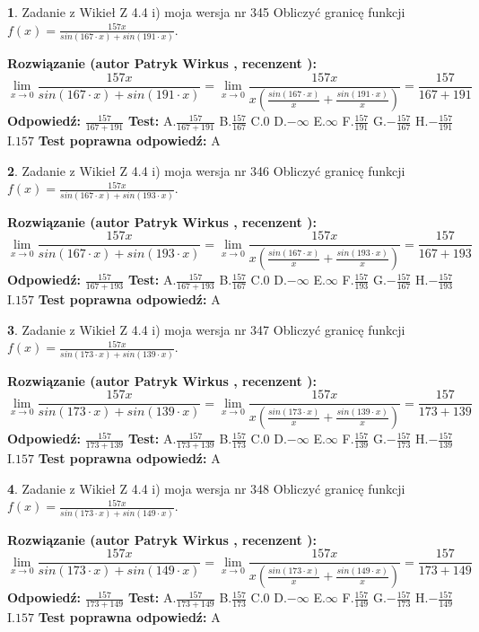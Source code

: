 \documentclass[12pt, a4paper]{article}
\theoremstyle{definition} %
\newtheorem{zad}{}
\newcommand{\zadStart}[1]{\begin{zad}#1\newline}
\newcommand{\zadStop}{\end{zad}}
\newcommand{\rozwStart}[2]{\noindent \textbf{Rozwiązanie (autor #1 , recenzent #2): }\newline}
\newcommand{\rozwStop}{\newline}
\newcommand{\odpStart}{\noindent \textbf{Odpowiedź:}\newline}
\newcommand{\odpStop}{\newline}
\newcommand{\testStart}{\noindent \textbf{Test:}\newline}
\newcommand{\testStop}{\newline}
\newcommand{\kluczStart}{\noindent \textbf{Test poprawna odpowiedź:}\newline}
\newcommand{\kluczStop}{\newline}
\begin{document}
\zadStart{Zadanie z Wikieł Z 4.4 i) moja wersja nr 345}
Obliczyć granicę funkcji $f(x)=\frac{157x}{sin(167\cdot x) +sin(191\cdot x)}$.
\zadStop
\rozwStart{Patryk Wirkus}{}
$$\lim\limits_{x\to 0}\frac{157x}{sin(167\cdot x) +sin(191\cdot x)}=\lim\limits_{x\to 0}\frac{157x}{x(\frac{sin(167\cdot x)}{x}+\frac{sin(191\cdot x)}{x})}=\frac{157}{167+191}$$
\rozwStop
\odpStart
$\frac{157}{167+191}$
\odpStop
\testStart
A.$\frac{157}{167+191}$
B.$\frac{157}{167}$
C.$0$
D.$-\infty$
E.$\infty$
F.$\frac{157}{191}$
G.$-\frac{157}{167}$
H.$-\frac{157}{191}$
I.$157$
\testStop
\kluczStart
A
\kluczStop



\zadStart{Zadanie z Wikieł Z 4.4 i) moja wersja nr 346}
Obliczyć granicę funkcji $f(x)=\frac{157x}{sin(167\cdot x) +sin(193\cdot x)}$.
\zadStop
\rozwStart{Patryk Wirkus}{}
$$\lim\limits_{x\to 0}\frac{157x}{sin(167\cdot x) +sin(193\cdot x)}=\lim\limits_{x\to 0}\frac{157x}{x(\frac{sin(167\cdot x)}{x}+\frac{sin(193\cdot x)}{x})}=\frac{157}{167+193}$$
\rozwStop
\odpStart
$\frac{157}{167+193}$
\odpStop
\testStart
A.$\frac{157}{167+193}$
B.$\frac{157}{167}$
C.$0$
D.$-\infty$
E.$\infty$
F.$\frac{157}{193}$
G.$-\frac{157}{167}$
H.$-\frac{157}{193}$
I.$157$
\testStop
\kluczStart
A
\kluczStop



\zadStart{Zadanie z Wikieł Z 4.4 i) moja wersja nr 347}
Obliczyć granicę funkcji $f(x)=\frac{157x}{sin(173\cdot x) +sin(139\cdot x)}$.
\zadStop
\rozwStart{Patryk Wirkus}{}
$$\lim\limits_{x\to 0}\frac{157x}{sin(173\cdot x) +sin(139\cdot x)}=\lim\limits_{x\to 0}\frac{157x}{x(\frac{sin(173\cdot x)}{x}+\frac{sin(139\cdot x)}{x})}=\frac{157}{173+139}$$
\rozwStop
\odpStart
$\frac{157}{173+139}$
\odpStop
\testStart
A.$\frac{157}{173+139}$
B.$\frac{157}{173}$
C.$0$
D.$-\infty$
E.$\infty$
F.$\frac{157}{139}$
G.$-\frac{157}{173}$
H.$-\frac{157}{139}$
I.$157$
\testStop
\kluczStart
A
\kluczStop



\zadStart{Zadanie z Wikieł Z 4.4 i) moja wersja nr 348}
Obliczyć granicę funkcji $f(x)=\frac{157x}{sin(173\cdot x) +sin(149\cdot x)}$.
\zadStop
\rozwStart{Patryk Wirkus}{}
$$\lim\limits_{x\to 0}\frac{157x}{sin(173\cdot x) +sin(149\cdot x)}=\lim\limits_{x\to 0}\frac{157x}{x(\frac{sin(173\cdot x)}{x}+\frac{sin(149\cdot x)}{x})}=\frac{157}{173+149}$$
\rozwStop
\odpStart
$\frac{157}{173+149}$
\odpStop
\testStart
A.$\frac{157}{173+149}$
B.$\frac{157}{173}$
C.$0$
D.$-\infty$
E.$\infty$
F.$\frac{157}{149}$
G.$-\frac{157}{173}$
H.$-\frac{157}{149}$
I.$157$
\testStop
\kluczStart
A
\kluczStop
\end{document}
